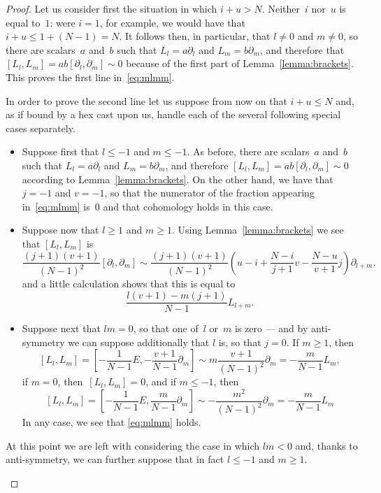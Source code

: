 \begin{proof}
Let us consider first the situation in which $i+u>N$. Neither~$i$ nor~$u$
is equal to~$1$: were $i=1$, for example, we would have that $i+u\leq
1+(N-1)=N$. It follows then, in particular, that $l\neq0$ and $m\neq0$, so
there are scalars~$a$ and~$b$ such that $L_l=a\partial_l$ and
$L_m=b\partial_m$, and therefore that
$[L_l,L_m]=ab[\partial_l,\partial_m]\sim0$ because of the first part of
Lemma~\ref{lemma:brackets}. This proves the first line in~\eqref{eq:mlmm}.

In order to prove the second line let us suppose from now on that 
$i+u\leq N$ and, as if bound by a hex cast upon us, handle each of the 
several following special cases separately.
\begin{itemize}

\item Suppose first that $l\leq-1$ and $m\leq-1$. As before, there are
scalars~$a$ and~$b$ such that $L_l=a\partial_l$ and $L_m=b\partial_m$, and
therefore $[L_l,L_m]=ab[\partial_l,\partial_m]\sim0$ according to
Lemma~\ref{lemma:brackets}. On the other hand, we have that $j=-1$ and
$v=-1$, so that the numerator of the fraction appearing in~\eqref{eq:mlmm}
is~$0$ and that cohomology holds in this case.

\item Suppose now that $l\geq1$ and $m\geq1$. Using
Lemma~\ref{lemma:brackets} we see that $[L_l,L_m]$ is 
  \[
  \frac{(j+1)(v+1)}{(N-1)^2} [\partial_l,\partial_m] 
        \sim \frac{(j+1)(v+1)}{(N-1)^2}
          \left(u-i+\frac{N-i}{j+1}v-\frac{N-u}{v+1}j\right)\partial_{l+m},
  \]
and a little calculation shows that this is equal to 
  \[
  \frac{l(v+1)-m(j+1)}{N-1}L_{l+m}.
  \]

\item Suppose next that $lm=0$, so that one of~$l$ or~$m$ is zero --- and
by anti-symmetry we can suppose additionally that $l$ is, so that $j=0$. If
$m\geq1$, then
  \[
    [L_l,L_m]
      = \left[-\frac{1}{N-1}E,-\frac{v+1}{N-1}\partial_m\right] 
      \sim m\frac{v+1}{(N-1)^2}\partial_m
      = -\frac{m}{N-1}L_m,
  \]
if $m=0$, then~$[L_l,L_m]=0$, and if $m\leq-1$, then
  \[
    [L_l,L_m]
      = \left[-\frac{1}{N-1}E,\frac{m}{N-1}\partial_m\right] 
      \sim -\frac{m^2}{(N-1)^2}\partial_m
      = -\frac{m}{N-1}L_m 
  \]
In any case, we see that \eqref{eq:mlmm} holds.

\end{itemize}
At this point we are left with considering the case in which $lm<0$ and,
thanks to anti-symmetry, we can further suppose that in fact $l\leq-1$ and
$m\geq1$.
\begin{itemize}


\end{itemize}
\end{proof}
